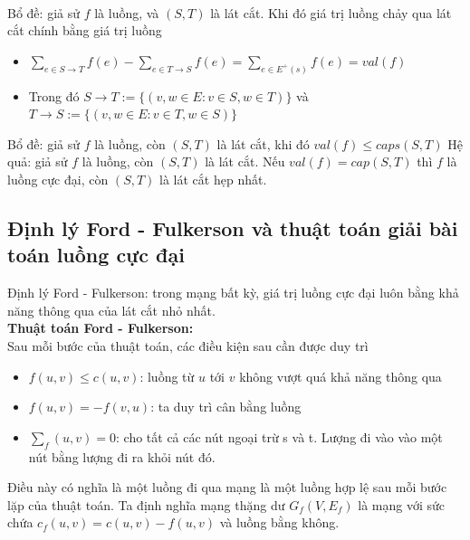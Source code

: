 \\Bổ đề: giả sử $f$ là luồng, và $(S, T)$ là lát cắt. Khi đó giá trị luồng chảy qua lát cắt chính bằng giá trị luồng
\begin{itemize}
    \item $\sum_{e \in S \rightarrow T} f(e) - \sum_{e \in T \rightarrow S} f(e) = \sum_{e \in E^+(s)} f(e) = val(f)$
    \item Trong đó $S \rightarrow T := \{(v, w \in E: v \in S, w \in T)\}$ và $T \rightarrow S := \{(v, w \in E: v \in T, w \in S)\}$
\end{itemize}
Bổ đề: giả sử $f$ là luồng, còn $(S, T)$ là lát cắt, khi đó $val(f) \leq caps(S, T)$
Hệ quả: giả sử $f$ là luồng, còn $(S, T)$ là lát cắt. Nếu $val(f) = cap(S, T)$ thì $f$ là luồng cực đại, còn $(S, T)$ là lát cắt hẹp nhất.
\subsection{Định lý Ford - Fulkerson và thuật toán giải bài toán luồng cực đại}
Định lý Ford - Fulkerson: trong mạng bất kỳ, giá trị luồng cực đại luôn bằng khả năng thông qua của lát cắt nhỏ nhất.
\\ \textbf{Thuật toán Ford - Fulkerson:} 
\\Sau mỗi bước của thuật toán, các điều kiện sau cần được duy trì
\begin{itemize}
    \item $f(u, v) \leq c(u, v)$: luồng từ $u$ tới $v$ không vượt quá khả năng thông qua
    \item $f(u, v) = -f(v, u)$: ta duy trì cân bằng luồng 
    \item $\sum_f(u,v) = 0$: cho tất cả các nút ngoại trừ s và t. Lượng đi vào vào một nút bằng lượng đi ra khỏi nút đó. 
\end{itemize}
Điều này có nghĩa là một luồng đi qua mạng là một luồng hợp lệ sau mỗi bước lặp của thuật toán. Ta định nghĩa mạng thặng dư $G_f (V, E_f)$ là mạng với sức chứa $c_f (u, v) = c (u, v) - f (u, v)$ và luồng bằng không.

